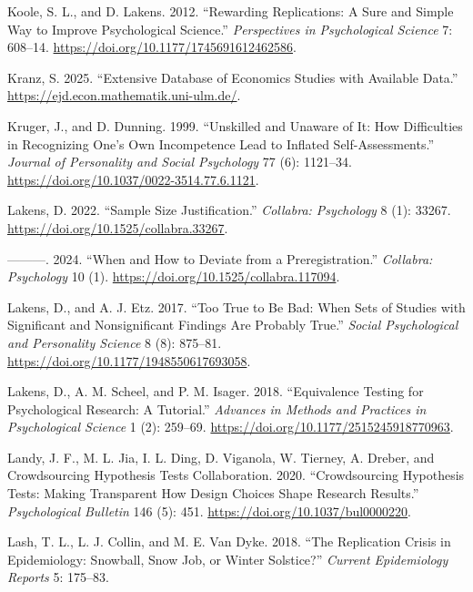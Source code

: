 \documentclass[
  letterpaper,
  DIV=11,
  openany,
  fontsize=12pt,
  parskip=half,
  headings=big,
  numbers=noenddot,
  titlepage=false]{scrreprt}
\newlength{\cslhangindent}
\newenvironment{CSLReferences}[2] %
 {\begin{list}{}{%
  \setlength{\itemindent}{0pt}
  \setlength{\leftmargin}{0pt}
  \setlength{\parsep}{0pt}
  \ifodd #1
   \setlength{\leftmargin}{\cslhangindent}
   \setlength{\itemindent}{-1\cslhangindent}
  \fi
  \setlength{\itemsep}{#2\baselineskip}}}
 {\end{list}}
\begin{document}
\begin{CSLReferences}{1}{0}
Koole, S. L., and D. Lakens. 2012. {``Rewarding Replications: A Sure and
Simple Way to Improve Psychological Science.''} \emph{Perspectives in
Psychological Science} 7: 608--14.
\url{https://doi.org/10.1177/1745691612462586}.

Kranz, S. 2025. {``Extensive Database of Economics Studies with
Available Data.''} \url{https://ejd.econ.mathematik.uni-ulm.de/}.

Kruger, J., and D. Dunning. 1999. {``Unskilled and Unaware of It: How
Difficulties in Recognizing One's Own Incompetence Lead to Inflated
Self-Assessments.''} \emph{Journal of Personality and Social Psychology}
77 (6): 1121--34. \url{https://doi.org/10.1037/0022-3514.77.6.1121}.

Lakens, D. 2022. {``Sample Size Justification.''} \emph{Collabra:
Psychology} 8 (1): 33267. \url{https://doi.org/10.1525/collabra.33267}.

---------. 2024. {``When and How to Deviate from a Preregistration.''}
\emph{Collabra: Psychology} 10 (1).
\url{https://doi.org/10.1525/collabra.117094}.

Lakens, D., and A. J. Etz. 2017. {``Too True to Be Bad: When Sets of
Studies with Significant and Nonsignificant Findings Are Probably
True.''} \emph{Social Psychological and Personality Science} 8 (8):
875--81. \url{https://doi.org/10.1177/1948550617693058}.

Lakens, D., A. M. Scheel, and P. M. Isager. 2018. {``Equivalence Testing
for Psychological Research: A Tutorial.''} \emph{Advances in Methods and
Practices in Psychological Science} 1 (2): 259--69.
\url{https://doi.org/10.1177/2515245918770963}.

Landy, J. F., M. L. Jia, I. L. Ding, D. Viganola, W. Tierney, A. Dreber,
and Crowdsourcing Hypothesis Tests Collaboration. 2020. {``Crowdsourcing
Hypothesis Tests: Making Transparent How Design Choices Shape Research
Results.''} \emph{Psychological Bulletin} 146 (5): 451.
\url{https://doi.org/10.1037/bul0000220}.

Lash, T. L., L. J. Collin, and M. E. Van Dyke. 2018. {``The Replication
Crisis in Epidemiology: Snowball, Snow Job, or Winter Solstice?''}
\emph{Current Epidemiology Reports} 5: 175--83.


\end{CSLReferences}
\end{document}
